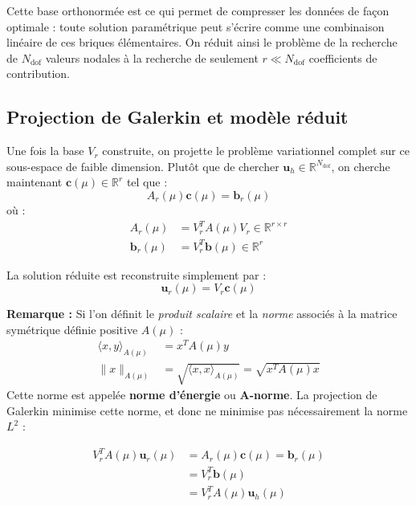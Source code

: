 \documentclass[12pt,a4paper]{article}
\begin{document}
Cette base orthonormée est ce qui permet de compresser les données de façon optimale : toute solution paramétrique peut s'écrire comme une combinaison linéaire de ces briques élémentaires. On réduit ainsi le problème de la recherche de $N_{\text{dof}}$ valeurs nodales à la recherche de seulement $r \ll N_{\text{dof}}$ coefficients de contribution.

\subsection{Projection de Galerkin et modèle réduit}
 
 
Une fois la base $V_r$ construite, on projette le problème variationnel complet sur ce sous-espace de faible dimension. Plutôt que de chercher $\mathbf{u}_h \in \mathbb{R}^{N_{\text{dof}}}$, on cherche maintenant $\mathbf{c}(\mu) \in \mathbb{R}^r$ tel que :
\begin{equation*}
    A_r(\mu) \mathbf{c}(\mu) = \mathbf{b}_r(\mu)
\end{equation*}
où :
\begin{align}
    A_r(\mu) &= V_r^T A(\mu) V_r \in \mathbb{R}^{r \times r} \\
    \mathbf{b}_r(\mu) &= V_r^T \mathbf{b}(\mu) \in \mathbb{R}^r
\end{align}
 
La solution réduite est reconstruite simplement par :
\begin{equation*}
    \mathbf{u}_r(\mu) = V_r \mathbf{c}(\mu)
\end{equation*}
 
\textbf{Remarque :} Si l'on définit le \emph{produit scalaire} et la \emph{norme} associés à la matrice symétrique définie positive $A(\mu)$ :
\begin{align}
\langle x, y \rangle_{A(\mu)} &= x^T A(\mu)y \\
\| x \|_{A(\mu)} &= \sqrt{\langle x, x \rangle_{A(\mu)}} = \sqrt{x^T A(\mu) x}
\end{align}
Cette norme est appelée \textbf{norme d'énergie} ou \textbf{A-norme}. La projection de Galerkin minimise cette norme, et donc ne minimise pas nécessairement la norme $L^2$ :
 
\begin{align}
    V_r^T A(\mu) \mathbf{u}_r(\mu) &= A_r(\mu) \mathbf{c}(\mu) = \mathbf{b}_r(\mu) \\
    &= V_r^T \mathbf{b}(\mu) \\
    &= V_r^T A(\mu) \mathbf{u}_h(\mu)
\end{align}
 
\end{document}
